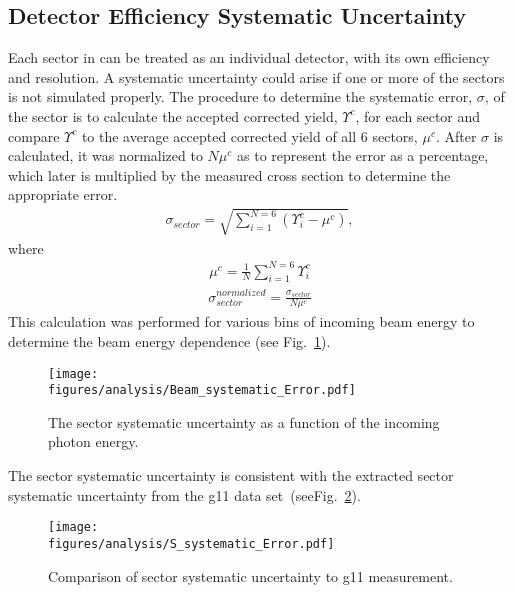  			
 			
 			\subsection{Detector Efficiency Systematic Uncertainty}
 			Each sector in  can be treated as an individual detector, with its own efficiency and resolution. A systematic uncertainty could arise if one or more of the sectors is not simulated properly. The procedure to determine the systematic error, $\sigma$, of the sector is to calculate the accepted corrected yield, $\Upsilon^c$, for each sector and compare $\Upsilon^c$ to the average accepted corrected yield of all 6 sectors, $\mu^c$. After $\sigma$ is calculated, it was normalized to $N \mu^c$ as to represent the error as a percentage, which later is multiplied by the measured cross section to determine the appropriate error. 
 			\begin{align}
 				\sigma_{sector} = \sqrt{\sum_{i=1}^{N = 6}\left(\Upsilon_i^c - \mu^c\right)},
 			\end{align}
 			where
 			\begin{align}
 				\mu^c = \frac{1}{N}\sum_{i=1}^{N=6}\Upsilon_i^c
 			\end{align}
 			\begin{align}
 				\sigma_{sector}^{normalized} = \frac{\sigma_{sector}}{N\mu^c}
 			\end{align}
 			This calculation was performed for various bins of incoming beam energy to determine the beam energy dependence (see Fig.~\ref{fig:sys_sec_error}).
 			
 			\begin{figure}[h!]\begin{center}
 					\texttt{[image: \\figures/analysis/Beam\_systematic\_Error.pdf]}
 					\caption[The sector systematic uncertainty as a function of the incoming photon energy]{\label{fig:sys_sec_error}The sector systematic uncertainty as a function of the incoming photon energy.}
 				\end{center}\end{figure}
 				The sector systematic uncertainty is consistent with the extracted sector systematic uncertainty from the g11 data set~\cite{williams}(seeFig.~\ref{fig:sys_sec_error.compare}).
 				\begin{figure}[h!]\begin{center}
 						\texttt{[image: \\figures/analysis/S\_systematic\_Error.pdf]}
 						\caption[Comparison of sector systematic uncertainty to g11 measurement]{\label{fig:sys_sec_error.compare}Comparison of sector systematic uncertainty to g11 measurement.}
 					\end{center}\end{figure}
 					\FloatBarrier
 					

